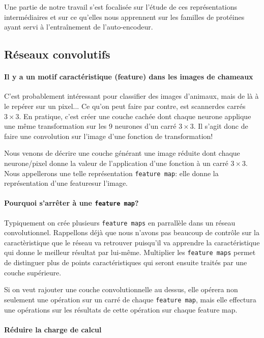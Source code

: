 \documentclass[a4paper,11pt]{article}
\begin{document}
Une partie de notre travail s'est focalisée sur l'étude de ces représentations
intermédiaires et sur ce qu'elles nous apprennent sur les familles de protéines
ayant servi à l'entraînement de l'auto-encodeur.

\subsection{Réseaux convolutifs}

\paragraph{Il y a un motif caractéristique (feature) dans les images de chameaux}

C'est probablement intéressant pour classifier des images d'animaux, mais de là
à le repérer sur un pixel... Ce qu'on peut faire par contre, est \og
scanner\fg des carrés $3\times 3$. En pratique, c'est créer une couche cachée
dont chaque neurone applique une même transformation sur les 9 neurones d'un
carré $3\times 3$. Il s'agit donc de faire une convolution sur l'image d'une
fonction de transformation!

Nous venons de décrire une couche générant une image réduite dont chaque
neurone/pixel donne la valeur de l'application d'une fonction à un carré
$3\times 3$. Nous appellerons une telle représentation \texttt{feature map}:
elle donne la représentation d'une \og feature\fg sur l'image.

\paragraph{Pourquoi s'arrêter à une \texttt{feature map}?}

Typiquement on crée plusieurs \texttt{feature maps} en parrallèle dans un réseau
convolutionnel. Rappellons déjà que nous n'avons pas beaucoup de contrôle sur la
caractèristique que le réseau va retrouver puisqu'il va apprendre la
caractéristique qui donne le meilleur résultat par lui-même. Multiplier les
\texttt{feature maps} permet de distinguer plus de points caractéristiques qui
seront ensuite traités par une couche supérieure.

Si on veut rajouter une couche convolutionnelle au dessus, elle opérera non
seulement une opération sur un carré de chaque \texttt{feature map}, mais elle
effectura une opérations sur les résultats de cette opération sur chaque feature
map.

\paragraph{Réduire la charge de calcul}
\end{document}
